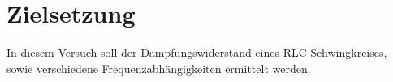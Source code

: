 \section{Zielsetzung}

In diesem Versuch soll der Dämpfungswiderstand eines RLC-Schwingkreises, sowie verschiedene Frequenzabhängigkeiten ermittelt werden.